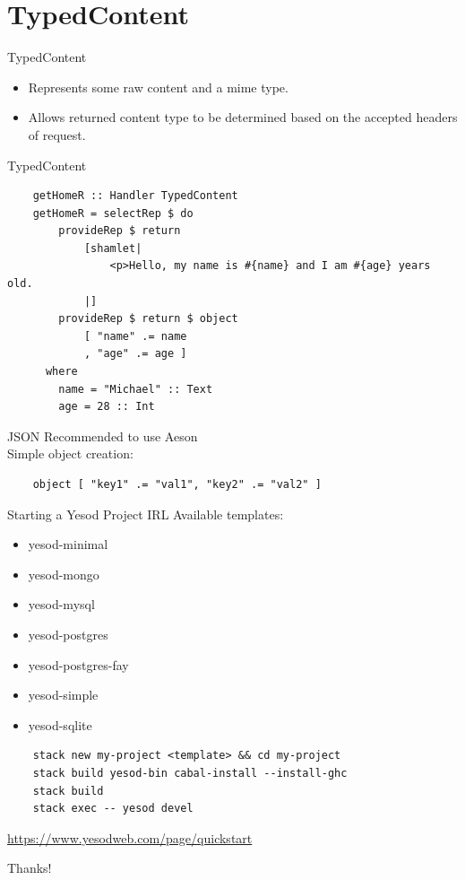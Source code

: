 \documentclass[pdf]{beamer}
\begin{document}
\section{TypedContent}

\begin{frame}{TypedContent}
  \begin{itemize}
  \item Represents some raw content and a mime type.
  \item Allows returned content type to be determined based on the
    accepted headers of request.
  \end{itemize}
\end{frame}

\begin{frame}[fragile]{TypedContent}
  \begin{verbatim}
    getHomeR :: Handler TypedContent
    getHomeR = selectRep $ do
        provideRep $ return
            [shamlet|
                <p>Hello, my name is #{name} and I am #{age} years old.
            |]
        provideRep $ return $ object
            [ "name" .= name
            , "age" .= age ]
      where
        name = "Michael" :: Text
        age = 28 :: Int
  \end{verbatim}
\end{frame}

\begin{frame}[fragile]{JSON}
  Recommended to use Aeson\\
  Simple object creation:
  \begin{verbatim}
    object [ "key1" .= "val1", "key2" .= "val2" ]
  \end{verbatim}
\end{frame}

\begin{frame}[fragile]{Starting a Yesod Project IRL}
  Available templates:
  \begin{itemize}
  \item yesod-minimal
  \item yesod-mongo
  \item yesod-mysql
  \item yesod-postgres
  \item yesod-postgres-fay
  \item yesod-simple
  \item yesod-sqlite
  \end{itemize}
  \begin{verbatim}
    stack new my-project <template> && cd my-project
    stack build yesod-bin cabal-install --install-ghc
    stack build
    stack exec -- yesod devel
  \end{verbatim}
  \url{https://www.yesodweb.com/page/quickstart}
\end{frame}

\begin{frame}{Thanks!}
  
\end{frame}
\end{document}
